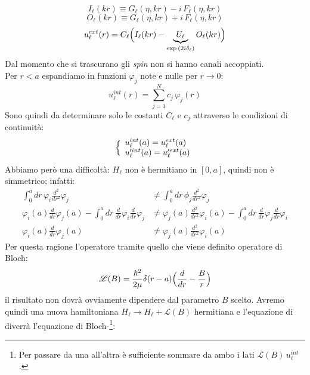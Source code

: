 $$ I_\ell (kr) \equiv G_\ell (\eta,kr) - i\, F_\ell(\eta,kr) $$
$$ O_\ell (kr) \equiv G_\ell (\eta,kr) + i\, F_\ell(\eta,kr) $$
\begin{equation}\label{0412_uext}
u_\ell^{ext} (r) = C_\ell \Bigl ( I_\ell(kr) - \underbrace{U_\ell}_{\exp{(2i\delta_\ell)}}O_\ell(kr) \Bigr )
\end{equation}
Dal momento che si trascurano gli \textit{spin} non si hanno canali accoppiati.\\ 
Per $r<a$ espandiamo in funzioni $\varphi_j$ note e nulle per $r\to0$: %
\begin{equation}\label{0412_uint}
u_\ell^{int} (r) = \sum_{j=1}^N c_j \,\varphi_j(r)
\end{equation}
Sono quindi da determinare solo le costanti $C_\ell$ e $c_j$ attraverso le condizioni di continuità:
\begin{equation}\label{0412_cont}
\Bigl \{
\begin{array}{l}
u_\ell^{int}(a) = u_\ell^{ext}(a)\\ 
u_\ell'^{int}(a) = u_\ell'^{ext}(a)	
\end{array}
\end{equation}
Abbiamo però una difficoltà: $H_\ell$ non è hermitiano in $[0,a]$, quindi non è simmetrico; infatti:
\begin{displaymath}
	\begin{aligned}
	\int_0^a dr\, \varphi_i \frac{d^2}{dr^2} \varphi_j &\not = \int_0^a dr\, \phi_j \frac{d^2}{dr^2} \varphi_j \\ 
	\varphi_i (a) \frac{d}{dr}\varphi_j(a)-\int_0^a dr\,\frac{d}{dr}\varphi_i \frac{d}{dr}\varphi_j &\not = \varphi_j (a) \frac{d^2}{dr^2}\varphi_i (a) - \int_0^a dr\,\frac{d}{dr}\varphi_j \frac{d}{dr}\varphi_i  \\
	\varphi_i (a) \frac{d}{dr}\varphi_j(a) &\not = \varphi_j (a) \frac{d^2}{dr^2}\varphi_i (a) 
	\end{aligned}
\end{displaymath}
Per questa ragione  l'operatore tramite quello che viene definito operatore di Bloch:
\begin{equation}\label{0412_bloch}
\mathscr{L}(B) = \frac{\hbar^2}{2\mu}\delta(r-a) \Bigl ( \frac{d}{dr}-\frac{B}{r} \Bigr )
\end{equation}
il risultato non dovrà ovviamente dipendere dal parametro $B$ scelto. Avremo quindi una nuova hamiltoniana $H_\ell \to H_\ell + \mathscr{L}(B)$ hermitiana e l'equazione di \Sch{} diverrà l'equazione di Bloch-\Sch{}\footnote{Per passare da una all'altra è sufficiente sommare da ambo i lati $\mathscr{L}(B)\, u_\ell^{int}$.}:
